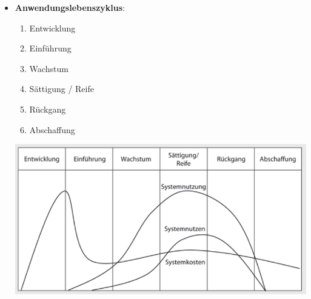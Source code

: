 \documentclass[12pt,a4paper]{article}
\begin{document}
\begin{itemize}
   \item \textbf{Anwendungslebenszyklus}:\\
      \begin{minipage}[t]{0.3\textwidth}\vspace*{0cm}
         \begin{enumerate}
				\item Entwicklung
				\item Einführung
				\item Wachstum
				\item Sättigung / Reife
				\item Rückgang
				\item Abschaffung
         \end{enumerate}
      \end{minipage}
      \begin{minipage}[t]{0.3\textwidth}\vspace*{0cm}
         \includegraphics[scale=0.5]{Anwendungsleben.png}
      \end{minipage}
      
      
      
\end{itemize}
\end{document}
